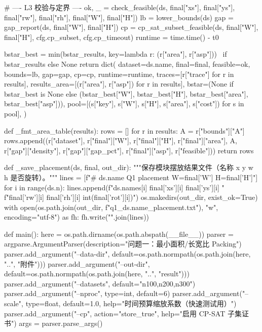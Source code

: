 \documentclass{JXUSTmodeling}
\begin{document}
\begin{appendixx}
\begin{python}
    # ---- L3 校验与定界 ----
    ok, _ = check_feasible(ds, final["xs"], final["ys"], final["rw"], final["rh"],
                           final["W"], final["H"])
    lb = lower_bounds(ds)
    gap = gap_report(ds, final["W"], final["H"])
    cp = cp_sat_subset_feasible(ds, final["W"], final["H"], cfg.cp_subset,
                                cfg.cp_timeout)
    runtime = time.time() - t0

    bstar_best = min(bstar_results, key=lambda r: (r["area"], r["asp"])) \
        if bstar_results else None
    return dict(
        dataset=ds.name, final=final, feasible=ok, bounds=lb, gap=gap, cp=cp,
        runtime=runtime, traces=[r["trace"] for r in results],
        results_area=[(r["area"], r["asp"]) for r in results],
        bstar=(None if bstar_best is None else
               (bstar_best["W"], bstar_best["H"], bstar_best["area"],
                bstar_best["asp"])),
        pool=[(s["key"], s["W"], s["H"], s["area"], s["cost"]) for s in pool],
    )


def _fmt_area_table(results):
    rows = []
    for r in results:
        A = r["bounds"]["A"]
        rows.append((r["dataset"], r["final"]["W"], r["final"]["H"],
                     r["final"]["area"], A, r["gap"]["density"],
                     r["gap"]["gap_pct"], r["final"]["asp"], r["feasible"]))
    return rows


def _save_placement(ds, final, out_dir):
    """保存模块摆放结果文件（名称 x y w h 是否旋转）。"""
    lines = [f"# {ds.name}  Q1 placement  W={final['W']} H={final['H']}"]
    for i in range(ds.n):
        lines.append(f"{ds.names[i]} {final['xs'][i]} {final['ys'][i]} "
                     f"{final['rw'][i]} {final['rh'][i]} {int(final['rot'][i])}")
    os.makedirs(out_dir, exist_ok=True)
    with open(os.path.join(out_dir, f"q1_{ds.name}_placement.txt"), "w",
              encoding="utf-8") as fh:
        fh.write("\n".join(lines))


def main():
    here = os.path.dirname(os.path.abspath(__file__))
    parser = argparse.ArgumentParser(description="问题一：最小面积/长宽比 Packing")
    parser.add_argument("--data-dir", default=os.path.normpath(os.path.join(here, "..", "附件")))
    parser.add_argument("--out-dir", default=os.path.normpath(os.path.join(here, "..", "result")))
    parser.add_argument("--datasets", default="n100,n200,n300")
    parser.add_argument("--nproc", type=int, default=6)
    parser.add_argument("--scale", type=float, default=1.0,
                        help="时间预算缩放系数（快速测试用）")
    parser.add_argument("--cp", action="store_true", help="启用 CP-SAT 子集证书")
    args = parser.parse_args()


\end{python}
\end{appendixx}
\end{document}
